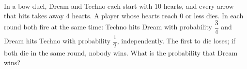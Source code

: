 In a bow duel, Dream and Techno each start with $10$ hearts, and every arrow that hits takes away $4$ hearts. A player whose hearts reach $0$ or less dies. In each round both fire at the same time: Techno hits Dream with probability $\dfrac34$ and Dream hits Techno with probability $\dfrac12$, independently. The first to die loses; if both die in the same round, nobody wins. What is the probability that Dream wins?
